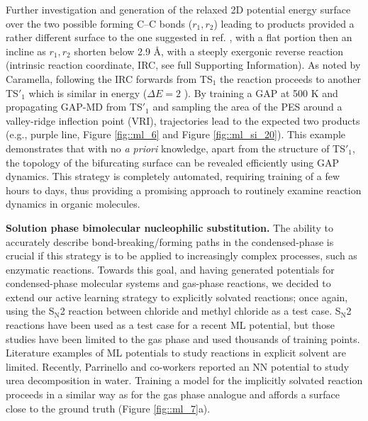 \documentclass[../../main.tex]{subfiles}
\begin{document}
Further investigation and generation of the relaxed 2D potential energy surface over the two possible forming C–C bonds ($r_1, r_2$) leading to products provided a rather different surface to the one suggested in ref. \cite{Caramella2002}, with a flat portion then an incline as $r_1, r_2$ shorten below 2.9 \AA, with a steeply exergonic reverse reaction (intrinsic reaction coordinate, IRC, see full Supporting Information). As noted by Caramella, following the IRC forwards from TS${}_1$ the reaction proceeds to another TS${}'_1$ which is similar in energy ($\Delta E = 2$ \kcal). By training a GAP at 500 K and propagating GAP-MD from TS${}'_1$ and sampling the area of the PES around a valley-ridge inflection point (VRI), trajectories lead to the expected two products (e.g., purple line, Figure \ref{fig::ml_6} and Figure \ref{fig::ml_si_20}). This example demonstrates that with no \emph{a priori} knowledge, apart from the structure of TS${}'_1$, the topology of the bifurcating surface can be revealed efficiently using GAP dynamics. This strategy is completely automated, requiring training of a few hours to days, thus providing a promising approach to routinely examine reaction dynamics in organic molecules.


{\bfseries{Solution phase bimolecular nucleophilic substitution.}} The ability to accurately describe bond-breaking/forming paths in the condensed-phase is crucial if this strategy is to be applied to increasingly complex processes, such as enzymatic reactions. Towards this goal, and having generated potentials for condensed-phase molecular systems and gas-phase reactions, we decided to extend our active learning strategy to explicitly solvated reactions; once again, using the S${}_\text{N}$2 reaction between chloride and methyl chloride as a test case. S${}_\text{N}$2 reactions have been used as a test case for a recent ML potential, but those studies have been limited to the gas phase and used thousands of training points.\cite{Unke2019} Literature examples of ML potentials to study reactions in explicit solvent are limited. Recently, Parrinello and co-workers reported an NN potential to study urea decomposition in water.\cite{Yang2021} Training a model for the implicitly solvated reaction proceeds in a similar way as for the gas phase analogue and affords a surface close to the ground truth (Figure \ref{fig::ml_7}a).
\end{document}
